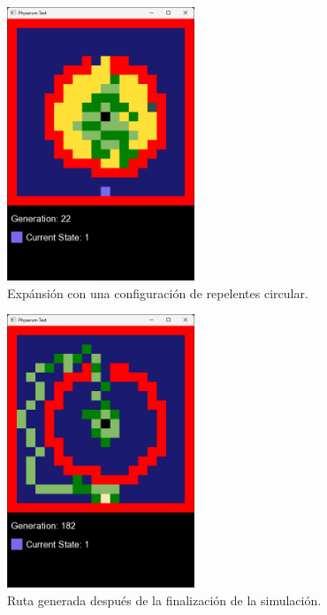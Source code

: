     \begin{figure}[htbp]
        \centering
        \includegraphics[width=0.5\textwidth]{./images/Pruebas/simulador/image073.png}
        \caption{Exp\'ansi\'on con una configuraci\'on de repelentes circular.}
        \label{fig:Ruta 73}
    \end{figure}
    \vskip 0.5cm
    \begin{figure}[htbp]
        \centering
        \includegraphics[width=0.5\textwidth]{./images/Pruebas/simulador/image075.png}
        \caption{Ruta generada despu\'es de la finalizaci\'on de la simulaci\'on.}
        \label{fig:Ruta 75}
    \end{figure}
    \clearpage